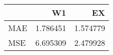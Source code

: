 \begin{tabular}{lrr}
\toprule
{} &        W1 &        EX \\
\midrule
MAE &  1.786451 &  1.574779 \\
MSE &  6.695309 &  2.479928 \\
\bottomrule
\end{tabular}
